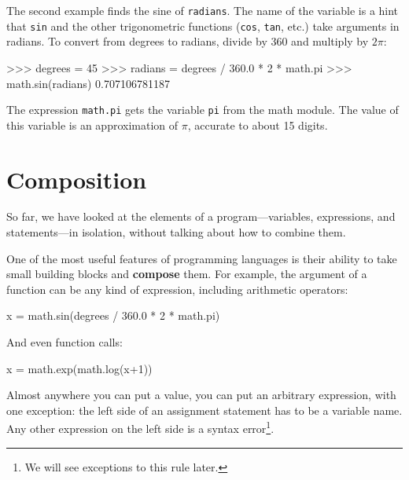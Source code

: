 
The second example finds the sine of {\tt radians}.  The name of the
variable is a hint that {\tt sin} and the other trigonometric
functions ({\tt cos}, {\tt tan}, etc.)  take arguments in radians. To
convert from degrees to radians, divide by 360 and multiply by $2
\pi$:

\beforeverb
\begin{pyinterpreter}
>>> degrees = 45
>>> radians = degrees / 360.0 * 2 * math.pi
>>> math.sin(radians)
0.707106781187
\end{pyinterpreter}
\afterverb
%
The expression {\tt math.pi} gets the variable {\tt pi} from the math
module.  The value of this variable is an approximation
of $\pi$, accurate to about 15 digits.


%
%
%

\section{Composition}

So far, we have looked at the elements of a program---variables,
expressions, and statements---in isolation, without talking about how to
combine them.

One of the most useful features of programming languages is their
ability to take small building blocks and {\bf compose} them.  For
example, the argument of a function can be any kind of expression,
including arithmetic operators:

\beforeverb
\begin{pyinterpreter}
x = math.sin(degrees / 360.0 * 2 * math.pi)
\end{pyinterpreter}
\afterverb
%
And even function calls:

\beforeverb
\begin{pyinterpreter}
x = math.exp(math.log(x+1))
\end{pyinterpreter}
\afterverb
%
Almost anywhere you can put a value, you can put an arbitrary
expression, with one exception: the left side of an assignment
statement has to be a variable name.  Any other expression on the left
side is a syntax error\footnote{We will see exceptions to this rule
later.}.


